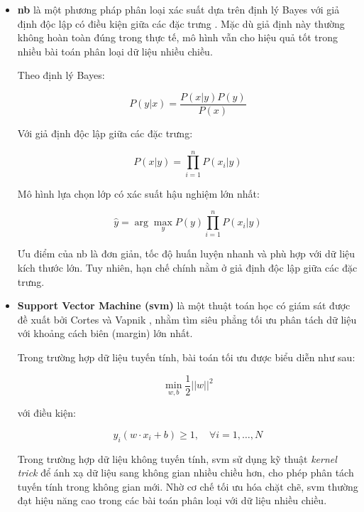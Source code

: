 \begin{itemize}
\item \textbf{\ac{nb}} là một phương pháp phân loại xác suất dựa trên định lý Bayes với giả định độc lập có điều kiện giữa các đặc trưng \cite{mccallum1998comparison}. Mặc dù giả định này thường không hoàn toàn đúng trong thực tế, mô hình vẫn cho hiệu quả tốt trong nhiều bài toán phân loại dữ liệu nhiều chiều.

Theo định lý Bayes:

\begin{equation}
P(y|x) = \frac{P(x|y)P(y)}{P(x)}
\end{equation}

Với giả định độc lập giữa các đặc trưng:

\begin{equation}
P(x|y) = \prod_{i=1}^{n} P(x_i|y)
\end{equation}

Mô hình lựa chọn lớp có xác suất hậu nghiệm lớn nhất:

\begin{equation}
\hat{y} = \arg\max_y P(y)\prod_{i=1}^{n} P(x_i|y)
\end{equation}

Ưu điểm của \ac{nb} là đơn giản, tốc độ huấn luyện nhanh và phù hợp với dữ liệu kích thước lớn. Tuy nhiên, hạn chế chính nằm ở giả định độc lập giữa các đặc trưng.

\item \textbf{Support Vector Machine (\ac{svm})} là một thuật toán học có giám sát được đề xuất bởi Cortes và Vapnik \cite{cortes1995support}, nhằm tìm siêu phẳng tối ưu phân tách dữ liệu với khoảng cách biên (margin) lớn nhất. 

Trong trường hợp dữ liệu tuyến tính, bài toán tối ưu được biểu diễn như sau:

\begin{equation}
\min_{w,b} \frac{1}{2} ||w||^2
\end{equation}

với điều kiện:

\begin{equation}
y_i(w \cdot x_i + b) \ge 1, \quad \forall i = 1, \dots, N
\end{equation}

Trong trường hợp dữ liệu không tuyến tính, \ac{svm} sử dụng kỹ thuật \textit{kernel trick} để ánh xạ dữ liệu sang không gian nhiều chiều hơn, cho phép phân tách tuyến tính trong không gian mới. Nhờ cơ chế tối ưu hóa chặt chẽ, \ac{svm} thường đạt hiệu năng cao trong các bài toán phân loại với dữ liệu nhiều chiều.


\end{itemize}
